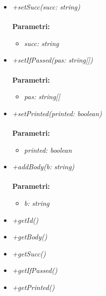 \begin{itemize}
\begin{itemize}
\begin{itemize}
    		\end{itemize}
    		\item \emph{+setSucc(succ: string)}\\
    		\\
    		\textbf{Parametri:}
    		\begin{itemize}
    			\item \emph{succ: string}\\
    			
    		\end{itemize}
    		\item \emph{+setIfPassed(pas: string[])}\\
    		\\
    		\textbf{Parametri:}
    		\begin{itemize}
    			\item \emph{pas: string[]}\\
    			
    		\end{itemize}
    		\item \emph{+setPrinted(printed: boolean)}\\
    		\\
    		\textbf{Parametri:}
    		\begin{itemize}
    			\item \emph{printed: boolean}\\
    			
    		\end{itemize}
    		\item \emph{+addBody(b: string)}\\
    		\\
    		\textbf{Parametri:}
    		\begin{itemize}
    			\item \emph{b: string}\\
    			
    		\end{itemize}
    		\item \emph{+getId()}\\
    		
    		\item \emph{+getBody()}\\
    		
    		\item \emph{+getSucc()}\\
    		
    		\item \emph{+getIfPassed()}\\
    		
    		\item \emph{+getPrinted()}\\
    		
    	\end{itemize}
\end{itemize}
